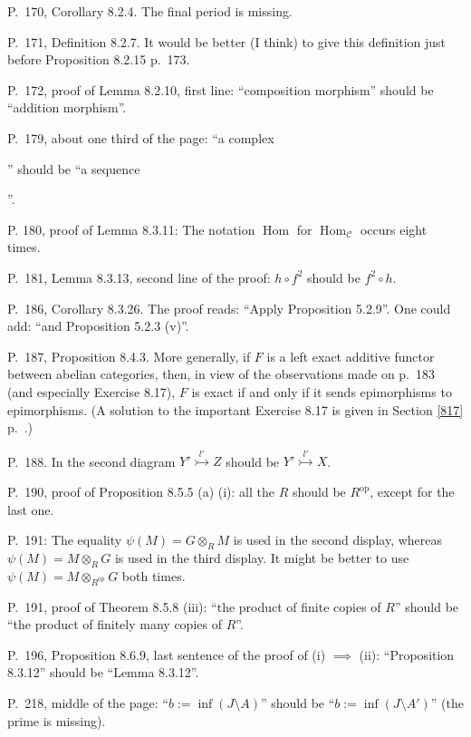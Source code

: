 \documentclass[12pt]{article}
\theoremstyle{remark}
\theoremstyle{definition}
\newcommand{\n}{\noindent}
\newcommand{\C}{\mathcal C}
\newcommand{\m}{\rightarrowtail}
\DeclareMathOperator{\h}{Hom}
\DeclareMathOperator{\op}{op}
\begin{document}
\n P.~170, Corollary 8.2.4. The final period is missing. 

\n P.~171, Definition 8.2.7. It would be better (I think) to give this definition just before Proposition 8.2.15 p.~173. 

\n P.~172, proof of Lemma 8.2.10, first line: ``composition morphism'' should be ``addition morphism''. 

\n P.~179, about one third of the page: ``a complex 
'' 
should be ``a sequence 
''. 

\n P. 180, proof of Lemma 8.3.11: The notation $\h$ for $\h_\C$ occurs eight times. 

\n P.~181, Lemma 8.3.13, second line of the proof: $h\circ f^2$ should be $f^2\circ h$. 

\n P.~186, Corollary 8.3.26. The proof reads: ``Apply Proposition 5.2.9''. One could add: ``and Proposition 5.2.3 (v)''. 

\n P.~187, Proposition 8.4.3. More generally, if $F$ is a left exact additive functor between abelian categories, then, in view of the observations made on p.~183 (and especially Exercise 8.17), $F$ is exact if and only if it sends epimorphisms to epimorphisms. (A solution to the important Exercise 8.17 is given in Section \ref{817} p.~\pageref{817}.) 

\n P.~188. In the second diagram $Y'\overset{l'}{\m}Z$ should be $Y'\overset{l'}{\m}X$. 

\n P.~190, proof of Proposition 8.5.5 (a) (i): all the $R$ should be $R^{\op}$, except for the last one.

\n P.~191: The equality $\psi(M)=G\otimes_RM$ is used in the second display, whereas $\psi(M)=M\otimes_RG$ is used in the third display. It might be better to use $\psi(M)=M\otimes_{R^{\op}}G$ both times.

\n P.~191, proof of Theorem 8.5.8 (iii): ``the product of finite copies of $R$'' should be ``the product of finitely many copies of $R$''.

\n P.~196, Proposition 8.6.9, last sentence of the proof of (i) $\implies$ (ii): ``Proposition 8.3.12'' should be ``Lemma 8.3.12''.

\n P.~218, middle of the page: ``$b:=\inf(J\setminus A)$'' should be ``$b:=\inf(J\setminus A')$'' (the prime is missing).
\end{document}
